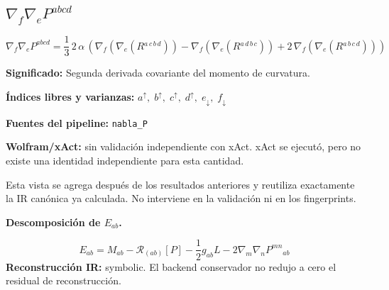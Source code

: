 \documentclass[11pt]{article}
\begin{document}
\subsection*{$ \nabla_f\nabla_e P^{abcd} $}
\begin{dmath*}[breakdepth={5}]
\nabla_f\nabla_e P^{abcd} = \frac{1}{3}\,2\,\alpha\,\left(\nabla_{f}\!\left(\nabla_{e}\!\left(R{}^{a\,c\,b\,d}\right)\right) - \nabla_{f}\!\left(\nabla_{e}\!\left(R{}^{a\,d\,b\,c}\right)\right) + 2\,\nabla_{f}\!\left(\nabla_{e}\!\left(R{}^{a\,b\,c\,d}\right)\right)\right)
\end{dmath*}
\par\vspace{1.2\baselineskip}\noindent
\begin{minipage}{\linewidth}
\textbf{Significado:} Segunda derivada covariante del momento de curvatura.\par
\textbf{Índices libres y varianzas:} $ a^{\uparrow},\;b^{\uparrow},\;c^{\uparrow},\;d^{\uparrow},\;e_{\downarrow},\;f_{\downarrow} $\par
\textbf{Fuentes del pipeline:} \texttt{nabla\_P}\par
\textbf{Wolfram/xAct:} sin validación independiente con xAct. xAct se ejecutó, pero no existe una identidad independiente para esta cantidad.\par
\end{minipage}
\par\bigskip{}\par
Esta vista se agrega después de los resultados anteriores y reutiliza exactamente la IR canónica ya calculada. No interviene en la validación ni en los fingerprints.\par
{}
\par\medskip\noindent\textbf{Descomposición de $ E_{ab} $.}\par
\begin{dmath*}[breakdepth={5}]
E_{ab}=M_{ab}-\mathcal{R}_{(ab)}[P]-\frac{1}{2}g_{ab}L-2\nabla_m\nabla_nP^{mn}{}_{ab}
\end{dmath*}
\textbf{Reconstrucción IR:} symbolic. El backend conservador no redujo a cero el residual de reconstrucción.\par
\end{document}
